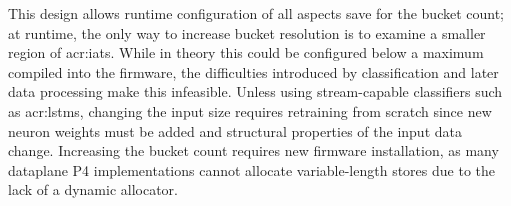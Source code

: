 

This design allows runtime configuration of all aspects save for the bucket count; at runtime, the only way to increase bucket resolution is to examine a smaller region of \glspl{acr:iat}.
While in theory this could be configured below a maximum compiled into the firmware, the difficulties introduced by classification and later data processing make this infeasible.
Unless using stream-capable classifiers such as \glspl{acr:lstm}, changing the input size requires retraining from scratch since new neuron weights must be added and structural properties of the input data change.
Increasing the bucket count requires new firmware installation, as many dataplane P4 implementations cannot allocate variable-length stores due to the lack of a dynamic allocator.

